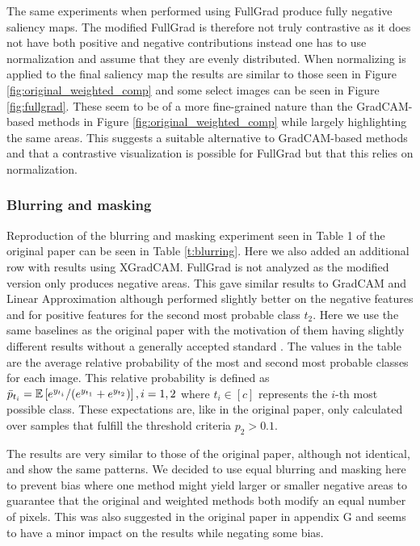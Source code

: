 The same experiments when performed using FullGrad produce fully negative saliency maps. The modified FullGrad is therefore not truly contrastive as it does not have both positive and negative contributions instead one has to use normalization and assume that they are evenly distributed. When normalizing is applied to the final saliency map the results are similar to those seen in Figure \ref{fig:original_weighted_comp} and some select images can be seen in Figure \ref{fig:fullgrad}. These seem to be of a more fine-grained nature than the GradCAM-based methods in Figure \ref{fig:original_weighted_comp} while largely highlighting the same areas. This suggests a suitable alternative to GradCAM-based methods and that a contrastive visualization is possible for FullGrad but that this relies on normalization.



\subsubsection{Blurring and masking}
Reproduction of the blurring and masking experiment seen in Table 1 of the original paper can be seen in Table \ref{t:blurring}. Here we also added an additional row with results using XGradCAM. FullGrad is not analyzed as the modified version only produces negative areas. This gave similar results to GradCAM and Linear Approximation although performed slightly better on the negative features and for positive features for the second most probable class $t_2$. Here we use the same baselines as the original paper with the motivation of them having slightly different results without a generally accepted standard \citep{baselinesimpact}. The values in the table are the average relative probability of the most and second most probable classes for each image. This relative probability is defined as $\Bar{p}_{t_i} = \mathbb{E}\left[e^{y_{t_i}} / (e^{y_{t_1}} + e^{y_{t_2}})  \right], i=1,2$ where $t_i \in [c]$ represents the $i$-th most possible class. These expectations are, like in the original paper, only calculated over samples that fulfill the threshold criteria $p_2 > 0.1$.

The results are very similar to those of the original paper, although not identical, and show the same patterns. We decided to use equal blurring and masking here to prevent bias where one method might yield larger or smaller negative areas to guarantee that the original and weighted methods both modify an equal number of pixels. This was also suggested in the original paper in appendix G and seems to have a minor impact on the results while negating some bias.

